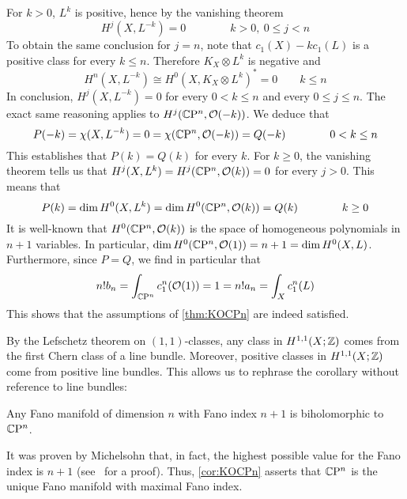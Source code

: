 \begin{myproof}
	For $k>0$, $L^k$ is positive, hence by the vanishing theorem
	\begin{equation*}
		H^j(X,L^{-k})=0 \qquad\qquad k>0,\ 0\leq j<n
	\end{equation*}
	To obtain the same conclusion for $j=n$, note that $c_1(X)-kc_1(L)$ is a positive class for every $k\leq n$. Therefore $K_X\otimes L^k$ is negative and
	\begin{equation*}
		H^n(X,L^{-k})\cong H^0(X,K_X\otimes L^k)^*=0 \qquad k\leq n
	\end{equation*}
	In conclusion, $H^j(X,L^{-k})=0$ for every $0< k\leq n$ and every $0\leq j\leq n$. The exact same reasoning applies to $H^j(\mathbb{C}\mathrm{P}^n,\mathcal{O}(-k))$. We deduce that
	\begin{equation*}
		 P(-k)=\chi(X,L^{-k})=0=\chi(\mathbb{C}\mathrm{P}^n,\mathcal{O}(-k))=Q(-k) \qquad \qquad 0<k\leq n
	\end{equation*}
	This establishes that $P(k)=Q(k)$ for every $k$. For $k\geq 0$, the vanishing theorem tells us that $H^j(X,L^k)=H^j(\mathbb{C}\mathrm{P}^n,\mathcal{O}(k))=0$ for every $j>0$. This means that
	\begin{equation*}
		P(k)=\dim H^0(X,L^k)=\dim H^0(\mathbb{C}\mathrm{P}^n,\mathcal{O}(k))=Q(k)
		\qquad \qquad k\geq 0
	\end{equation*}
	It is well-known that $H^0(\mathbb{C}\mathrm{P}^n,\mathcal{O}(k))$ is the space of homogeneous polynomials in $n+1$ variables. In particular, $\dim H^0(\mathbb{C}\mathrm{P}^n,\mathcal{O}(1))=n+1=\dim H^0(X,L)$. Furthermore, since $P=Q$, we find in particular that
	\begin{equation*}
		n! b_n=\int_{\mathbb{C}\mathrm{P}^n} c_1^n(\mathcal{O}(1))=1=n! a_n=\int_X c_1^n(L)
	\end{equation*}
	This shows that the assumptions of \cref{thm:KOCPn} are indeed satisfied.
\end{myproof}

By the Lefschetz theorem on $(1,1)$-classes, any class in $H^{1,1}(X;\mathbb{Z})$ comes from the first Chern class of a line bundle. Moreover, positive classes in $H^{1,1}(X;\mathbb{Z})$ come from positive line bundles. This allows us to rephrase the corollary without reference to line bundles:

\begin{cor}\label{cor:KOCPn}
	Any Fano manifold of dimension $n$ with Fano index $n+1$ is biholomorphic to $\mathbb{C}\mathrm{P}^n$.
\end{cor}

\begin{rem}
	It was proven by Michelsohn that, in fact, the highest possible value for the Fano index is $n+1$ (see~\cite[366]{LM1989} for a proof). Thus, \cref{cor:KOCPn} asserts that $\mathbb{C}\mathrm{P}^n$ is the unique Fano manifold with maximal Fano index.
\end{rem}

